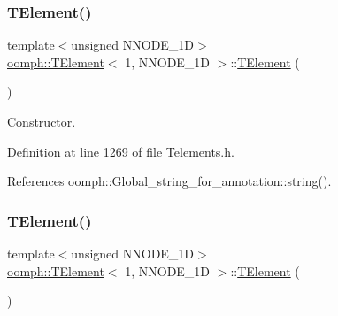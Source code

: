 \subsubsection{\texorpdfstring{T\+Element()}{TElement()}\hspace{0.1cm}{\footnotesize\ttfamily [1/2]}}
{\footnotesize\ttfamily template$<$unsigned N\+N\+O\+D\+E\+\_\+1D$>$ \\
\hyperlink{classoomph_1_1TElement}{oomph\+::\+T\+Element}$<$ 1, N\+N\+O\+D\+E\+\_\+1D $>$\+::\hyperlink{classoomph_1_1TElement}{T\+Element} (\begin{DoxyParamCaption}{ }\end{DoxyParamCaption})\hspace{0.3cm}{\ttfamily [inline]}}



Constructor. 



Definition at line 1269 of file Telements.\+h.



References oomph\+::\+Global\+\_\+string\+\_\+for\+\_\+annotation\+::string().

\mbox{\label{classoomph_1_1TElement_3_011_00_01NNODE__1D_01_4_a668a7e0412744a66e54906c58cdc4414}} 
\subsubsection{\texorpdfstring{T\+Element()}{TElement()}\hspace{0.1cm}{\footnotesize\ttfamily [2/2]}}
{\footnotesize\ttfamily template$<$unsigned N\+N\+O\+D\+E\+\_\+1D$>$ \\
\hyperlink{classoomph_1_1TElement}{oomph\+::\+T\+Element}$<$ 1, N\+N\+O\+D\+E\+\_\+1D $>$\+::\hyperlink{classoomph_1_1TElement}{T\+Element} (\begin{DoxyParamCaption}\item[{const \hyperlink{classoomph_1_1TElement}{T\+Element}$<$ 1, N\+N\+O\+D\+E\+\_\+1D $>$ \&}]{ }\end{DoxyParamCaption})\hspace{0.3cm}{\ttfamily [inline]}}



